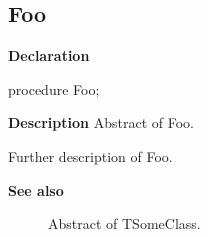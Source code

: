 \documentclass{report}
\begin{document}
\subsection*{Foo}
\begin{list}{}{
\setlength{\itemindent}{0cm}
\setlength{\listparindent}{0cm}
\setlength{\leftmargin}{\evensidemargin}
\addtolength{\leftmargin}{\tmplength}
\settowidth{\labelsep}{X}
\addtolength{\leftmargin}{\labelsep}
\setlength{\labelwidth}{\tmplength}
}
\begin{flushleft}
\item[\textbf{Declaration}\hfill]
\begin{ttfamily}
procedure Foo;\end{ttfamily}


\end{flushleft}
\par
\item[\textbf{Description}]
Abstract of Foo.\hfill\vspace*{1ex}

 Further description of Foo. \item[\textbf{See also}]
\begin{description}
\item[\begin{ttfamily}TSomeClass\end{ttfamily}(\ref{ok_see_also.TSomeClass})] 
Abstract of TSomeClass.
\end{description}


\end{list}
\end{document}
